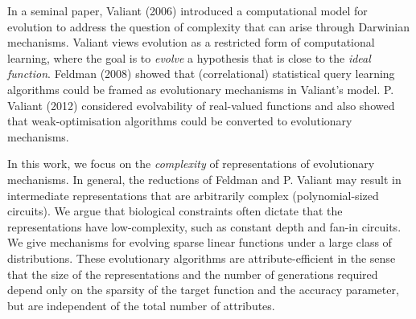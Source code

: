 In a seminal paper, Valiant (2006) introduced a computational model for
evolution to address the question of complexity that can arise through Darwinian
mechanisms. Valiant views evolution as a restricted form of computational
learning, where the goal is to \emph{evolve} a hypothesis that is close to the
\emph{ideal function}. Feldman (2008) showed that (correlational) statistical
query learning algorithms
could be framed as evolutionary mechanisms in Valiant's model. P. Valiant (2012)
considered evolvability of real-valued functions and also showed that
weak-optimisation algorithms could be converted to evolutionary mechanisms.

In this work, we focus on the \emph{complexity} of representations of
evolutionary mechanisms. In general, the reductions of Feldman and P. Valiant may
result in intermediate representations that are arbitrarily complex
(polynomial-sized circuits). We argue that biological constraints often dictate
that the representations have low-complexity, such as constant depth and fan-in
circuits. 
We give mechanisms for evolving sparse linear functions under a large
class of distributions. These evolutionary algorithms are attribute-efficient in
the sense that the size of the representations and the number of generations
required depend only on the sparsity of the target function and the accuracy
parameter, but are independent of the total number of attributes.
